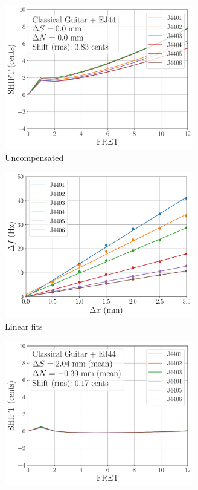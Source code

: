  \begin{figure}
  \centering
  \begin{subfigure}[b]{0.45\textwidth}
   \centering
   \includegraphics[width=3.25in]{figures/shift_classicalguitar_ej44_null}
   \caption{Uncompensated}
   \label{fig:shift_classicalguitar_ej44_null}
  \end{subfigure}
  \hspace{0.25in}
  \begin{subfigure}[b]{0.45\textwidth}
   \centering
   \includegraphics[width=3.25in]{figures/fit_ej44}
   \caption{Linear fits}
   \label{fig:fit_ej44}
  \end{subfigure}
  \par\vspace{0.25in}
  \begin{subfigure}[b]{0.45\textwidth}
   \centering
   \includegraphics[width=3.25in]{figures/shift_classicalguitar_ej44_full}

\end{subfigure}
\end{figure}
